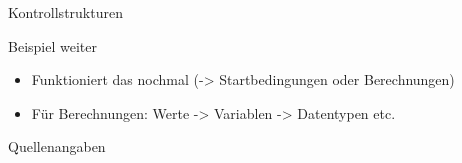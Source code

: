 \documentclass[t]{beamer}
\begin{document}
\begin{frame}{Kontrollstrukturen}
\end{frame}

\begin{frame}{Beispiel weiter}
	\begin{itemize}
		\item Funktioniert das nochmal (-> Startbedingungen oder Berechnungen)
		\item Für Berechnungen: Werte -> Variablen -> Datentypen etc.
	\end{itemize}
\end{frame}

\begin{frame}[allowframebreaks]{Quellenangaben}
    \printbibliography
\end{frame}


\end{document}
